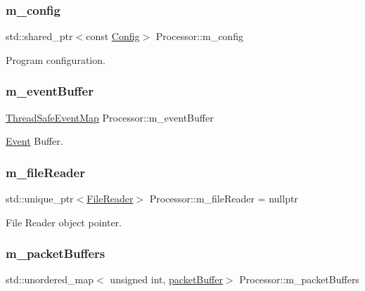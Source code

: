 \subsubsection{\texorpdfstring{m\+\_\+config}{m\_config}}
{\footnotesize\ttfamily std\+::shared\+\_\+ptr$<$const \hyperlink{class_config}{Config}$>$ Processor\+::m\+\_\+config\hspace{0.3cm}{\ttfamily [private]}}



Program configuration. 

\mbox{\label{class_processor_a7cb15fbab19fceb6bc5a607629ff5040}} 
\subsubsection{\texorpdfstring{m\+\_\+event\+Buffer}{m\_eventBuffer}}
{\footnotesize\ttfamily \hyperlink{class_thread_safe_event_map}{Thread\+Safe\+Event\+Map} Processor\+::m\+\_\+event\+Buffer\hspace{0.3cm}{\ttfamily [private]}}



\hyperlink{class_event}{Event} Buffer. 

\mbox{\label{class_processor_aafe2ae55e609005c0e88226f1dd1dcb5}} 
\subsubsection{\texorpdfstring{m\+\_\+file\+Reader}{m\_fileReader}}
{\footnotesize\ttfamily std\+::unique\+\_\+ptr$<$\hyperlink{class_file_reader}{File\+Reader}$>$ Processor\+::m\+\_\+file\+Reader = nullptr\hspace{0.3cm}{\ttfamily [private]}}



File Reader object pointer. 

\mbox{\label{class_processor_ab75c789ec03e38e8621f000332daa285}} 
\subsubsection{\texorpdfstring{m\+\_\+packet\+Buffers}{m\_packetBuffers}}
{\footnotesize\ttfamily std\+::unordered\+\_\+map$<$ unsigned int, \hyperlink{class_processor_a0cfd8ed0721769db91c142a19a392e0f}{packet\+Buffer}$>$ Processor\+::m\+\_\+packet\+Buffers\hspace{0.3cm}{\ttfamily [private]}}



